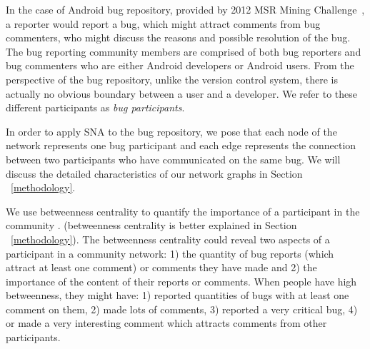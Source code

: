 \documentclass[10pt, conference, compsocconf]{IEEEtran}
\begin{document}

In the case of Android bug repository, provided by 2012 MSR
Mining Challenge~\cite{DATA:msr}, a reporter would report a bug, which
might attract comments from bug commenters, who might discuss the
reasons and possible resolution of the bug.
The bug reporting community members are comprised of both bug
reporters and bug commenters who are either Android developers or
Android users.
From the perspective of the bug repository, unlike the version control
system, there is actually no
obvious boundary between a user and a developer.
We refer to these different participants as \emph{bug participants}.

In order to apply SNA to the bug repository, we pose that each node of the network represents
one bug participant and each edge represents the connection between
two participants who have communicated on the same bug. 
We will discuss the detailed characteristics of our network graphs in
Section ~\ref{methodology}.

We use betweenness centrality to quantify the importance of a
participant in the community \cite{ICSEsocio:la}. 
(betweenness centrality is better explained in 
 Section ~\ref{methodology}).
The betweenness centrality could reveal two aspects of a participant
in a community network: 1) the quantity of bug reports (which attract
at least one comment) or comments they have made and 2) the importance
of the content of their reports or comments. 
When people have high betweenness, they might have: 1) reported
quantities of bugs with at least one comment on them, 2) made lots of
comments, 3) reported a very critical bug, 4) or made a very
interesting comment which attracts comments from other participants.


\end{document}
